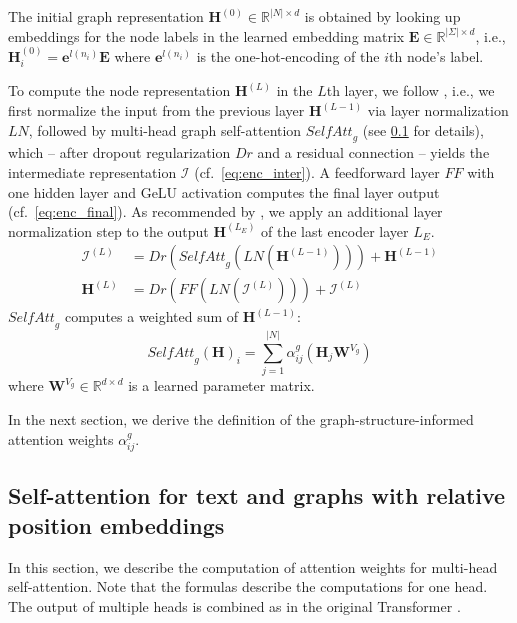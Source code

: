 \documentclass[11pt]{article}
\newcommand{\abs}[1]{\left|#1\right|}
\newcommand{\R}{\mathbb{R}}
\newcommand{\E}{L_E}  \newcommand{\D}{L_D}  \newcommand{\relset}{\mathcal{R}}
\newcommand{\mat}{\bm}  \let\oldvec\vec
\renewcommand{\vec}{\bm}
\begin{document}
The initial graph representation $\mat{H}^{(0)} \in \R^{\abs{N}\times d}$ is obtained by looking up embeddings for the node labels in the learned embedding matrix $\mat{E}\in \R^{\abs{\Sigma}\times d}$, i.e.,
$\vec{H}_i^{(0)} = \vec{e}^{l(n_i)} \mat{E}$ where $\vec{e}^{l(n_i)}$ is the one-hot-encoding of the $i$th node's label.

To compute the node representation $\mat{H}^{(L)}$ in the $L$th layer,
we follow \citet{vaswani17}, i.e.,
we first normalize the input from the previous layer $\mat{H}^{(L-1)}$ via layer normalization $\mathit{LN}$,
followed by multi-head graph self-attention $\mathit{SelfAtt}_g$ (see \cref{sec:self-att} for details),
which
-- after dropout regularization $\mathit{Dr}$ and a residual connection --
yields the intermediate representation $\mat{\mathcal{I}}$ (cf.\ \cref{eq:enc_inter}).
A feedforward layer $\mathit{FF}$ with one hidden layer and GeLU \citep{hendrycks16} activation
computes the final layer output (cf.\ \cref{eq:enc_final}).
As recommended by \citet{chen-etal-2018-best}, we apply an additional layer normalization step to the output $\mat{H}^{(\E)}$ of the last encoder layer $\E$.
\begin{align}
\label{eq:enc_inter}
\mat{\mathcal{I}}^{(L)} &= \mathit{Dr}(\mathit{SelfAtt}_g(\mathit{LN}(\mat{H}^{(L-1)}))) + \mat{H}^{(L-1)} \\
\label{eq:enc_final}
\mat{H}^{(L)} &= \mathit{Dr}(\mathit{FF}(\mathit{LN}(\mat{\mathcal{I}}^{(L)}))) + \mat{\mathcal{I}}^{(L)}
\end{align}
$\mathit{SelfAtt}_g$ computes a weighted sum of $\mat{H}^{(L-1)}$:
\begin{equation}
\label{eq:6}
\mathit{SelfAtt}_g(\mat{H})_i = \sum_{j=1}^{\abs{N}} \alpha_{ij}^g (\vec{H}_j \mat{W}^{V_{g}})
\end{equation}
where $\mat{W}^{V_g}\in\R^{d\times d}$ is a learned parameter matrix.

In the next section, we derive the definition of the graph-structure-informed attention weights $\alpha_{ij}^g$.

\subsection{Self-attention for text and graphs with relative position embeddings}
\label{sec:self-att}

In this section, we describe the computation of attention weights for multi-head self-attention.
Note that the formulas describe the computations for one head.
The output of multiple heads is combined as in the original Transformer \citep{vaswani17}.
\end{document}
